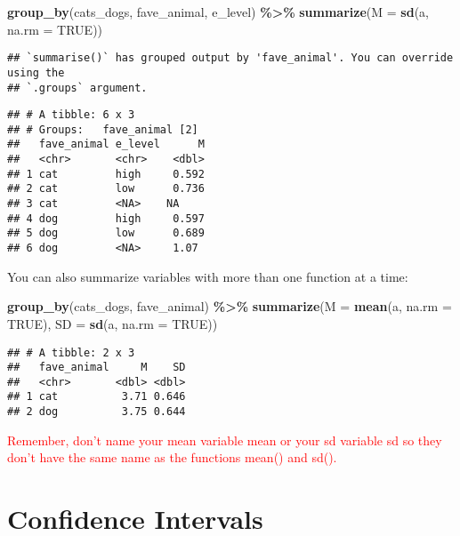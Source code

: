 \documentclass[
]{article}
\newenvironment{Shaded}{\begin{snugshade}}{\end{snugshade}}
\newcommand{\AttributeTok}[1]{\textcolor[rgb]{0.13,0.29,0.53}{#1}}
\newcommand{\ConstantTok}[1]{\textcolor[rgb]{0.56,0.35,0.01}{#1}}
\newcommand{\FunctionTok}[1]{\textcolor[rgb]{0.13,0.29,0.53}{\textbf{#1}}}
\newcommand{\NormalTok}[1]{#1}
\newcommand{\SpecialCharTok}[1]{\textcolor[rgb]{0.81,0.36,0.00}{\textbf{#1}}}
\begin{document}
\begin{Shaded}
\begin{Highlighting}[]
\FunctionTok{group\_by}\NormalTok{(cats\_dogs, fave\_animal, e\_level) }\SpecialCharTok{\%\textgreater{}\%} 
  \FunctionTok{summarize}\NormalTok{(}\AttributeTok{M =} \FunctionTok{sd}\NormalTok{(a, }\AttributeTok{na.rm =} \ConstantTok{TRUE}\NormalTok{))}
\end{Highlighting}
\end{Shaded}

\begin{verbatim}
## `summarise()` has grouped output by 'fave_animal'. You can override using the
## `.groups` argument.
\end{verbatim}

\begin{verbatim}
## # A tibble: 6 x 3
## # Groups:   fave_animal [2]
##   fave_animal e_level      M
##   <chr>       <chr>    <dbl>
## 1 cat         high     0.592
## 2 cat         low      0.736
## 3 cat         <NA>    NA    
## 4 dog         high     0.597
## 5 dog         low      0.689
## 6 dog         <NA>     1.07
\end{verbatim}

You can also summarize variables with more than one function at a time:

\begin{Shaded}
\begin{Highlighting}[]
\FunctionTok{group\_by}\NormalTok{(cats\_dogs, fave\_animal) }\SpecialCharTok{\%\textgreater{}\%} 
  \FunctionTok{summarize}\NormalTok{(}\AttributeTok{M =} \FunctionTok{mean}\NormalTok{(a, }\AttributeTok{na.rm =} \ConstantTok{TRUE}\NormalTok{), }\AttributeTok{SD =} \FunctionTok{sd}\NormalTok{(a, }\AttributeTok{na.rm =} \ConstantTok{TRUE}\NormalTok{)) }
\end{Highlighting}
\end{Shaded}

\begin{verbatim}
## # A tibble: 2 x 3
##   fave_animal     M    SD
##   <chr>       <dbl> <dbl>
## 1 cat          3.71 0.646
## 2 dog          3.75 0.644
\end{verbatim}

\textcolor{red}{Remember, don't name your mean variable mean or your sd variable sd so they don't have the same name as the functions mean() and sd().}

\hypertarget{confidence-intervals}{%
\section{Confidence Intervals}\label{confidence-intervals}}
\end{document}
